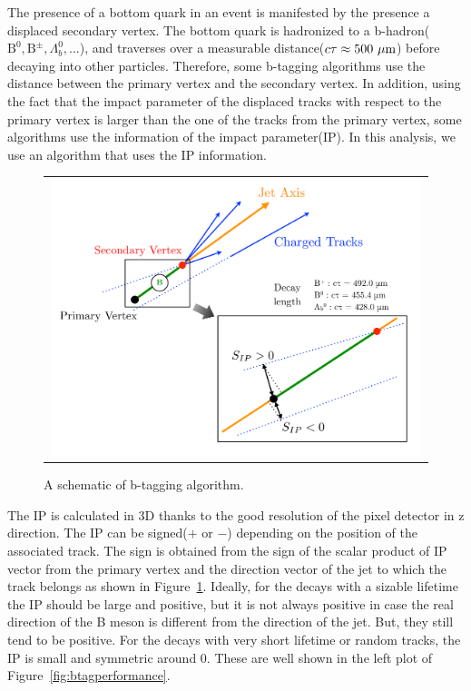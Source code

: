 The presence of a bottom quark in an event is manifested by the presence 
a displaced secondary vertex. 
The bottom quark is hadronized to a 
b-hadron($\textrm{B}^0, \textrm{B}^\pm, \Lambda_b^0, ...$), 
and traverses over a measurable distance($c\tau \approx 500~\mu\mathrm{m}$) before decaying into 
other particles. Therefore, some b-tagging algorithms use 
the distance between the primary vertex and the secondary vertex. 
In addition, using the fact that the impact parameter of the displaced 
tracks with respect to the primary vertex is larger than the one 
of the tracks from the primary vertex, some algorithms use the information 
of the impact parameter(IP). In this analysis, we use an algorithm that 
uses the IP information. 

\begin{figure}[htp] 
\centering 
\begin{tabular}{c} 
\includegraphics[width=0.99\textwidth]{figures/Btag.pdf} 
\end{tabular} 
\caption{A schematic of b-tagging algorithm.}
\label{fig:btag} 
\end{figure} 
The IP is calculated in 3D thanks to the good resolution of the 
pixel detector in z direction. The IP can be signed($+$ or $-$) 
depending on the position of the associated track. 
The sign is obtained from the sign of the scalar product of 
IP vector from the primary vertex and the direction vector of the jet 
to which the track belongs as shown in Figure~\ref{fig:btag}.
Ideally, for the decays with a sizable lifetime the IP should be large and positive, 
but it is not always positive in case the real direction of the B meson 
is different from the direction of the jet. But, they still tend to be positive. 
For the decays with very short lifetime or random tracks, 
the IP is small and symmetric around 0.   
These are well shown in the left plot of Figure~\ref{fig:btagperformance}.

